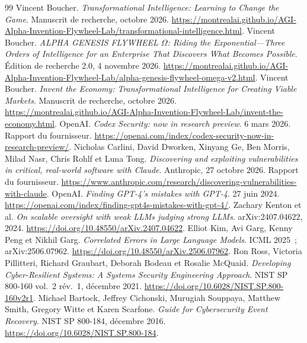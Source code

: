 \documentclass[11pt,a4paper]{article}
\newcommand{\chapterpage}{\clearpage}
\begin{document}
\chapterpage
\begingroup
\setlength{\parskip}{2pt}
\begin{thebibliography}{99}
\footnotesize
\setlength{\itemsep}{3pt}
 Vincent Boucher. \emph{Transformational Intelligence: Learning to Change the Game}. Manuscrit de recherche, octobre 2026. \url{https://montrealai.github.io/AGI-Alpha-Invention-Flywheel-Lab/transformational-intelligence.html}.
 Vincent Boucher. \emph{ALPHA GENESIS FLYWHEEL $\Omega$: Riding the Exponential---Three Orders of Intelligence for an Enterprise That Discovers What Becomes Possible}. Édition de recherche 2.0, 4 novembre 2026. \url{https://montrealai.github.io/AGI-Alpha-Invention-Flywheel-Lab/alpha-genesis-flywheel-omega-v2.html}.
 Vincent Boucher. \emph{Invent the Economy: Transformational Intelligence for Creating Viable Markets}. Manuscrit de recherche, octobre 2026. \url{https://montrealai.github.io/AGI-Alpha-Invention-Flywheel-Lab/invent-the-economy.html}.
 OpenAI. \emph{Codex Security: now in research preview}. 6 mars 2026. Rapport du fournisseur. \url{https://openai.com/index/codex-security-now-in-research-preview/}.
 Nicholas Carlini, David Dworken, Xinyang Ge, Ben Morris, Milad Nasr, Chris Rohlf et Luna Tong. \emph{Discovering and exploiting vulnerabilities in critical, real-world software with Claude}. Anthropic, 27 octobre 2026. Rapport du fournisseur. \url{https://www.anthropic.com/research/discovering-vulnerabilities-with-claude}.
 OpenAI. \emph{Finding GPT-4's mistakes with GPT-4}. 27 juin 2024. \url{https://openai.com/index/finding-gpt4s-mistakes-with-gpt-4/}.
 Zachary Kenton et al. \emph{On scalable oversight with weak LLMs judging strong LLMs}. arXiv:2407.04622, 2024. \url{https://doi.org/10.48550/arXiv.2407.04622}.
 Elliot Kim, Avi Garg, Kenny Peng et Nikhil Garg. \emph{Correlated Errors in Large Language Models}. ICML 2025~; arXiv:2506.07962. \url{https://doi.org/10.48550/arXiv.2506.07962}.
 Ron Ross, Victoria Pillitteri, Richard Graubart, Deborah Bodeau et Rosalie McQuaid. \emph{Developing Cyber-Resilient Systems: A Systems Security Engineering Approach}. NIST SP 800-160 vol.~2 rév.~1, décembre 2021. \url{https://doi.org/10.6028/NIST.SP.800-160v2r1}.
 Michael Bartock, Jeffrey Cichonski, Murugiah Souppaya, Matthew Smith, Gregory Witte et Karen Scarfone. \emph{Guide for Cybersecurity Event Recovery}. NIST SP 800-184, décembre 2016. \url{https://doi.org/10.6028/NIST.SP.800-184}.

\end{thebibliography}
\end{document}
